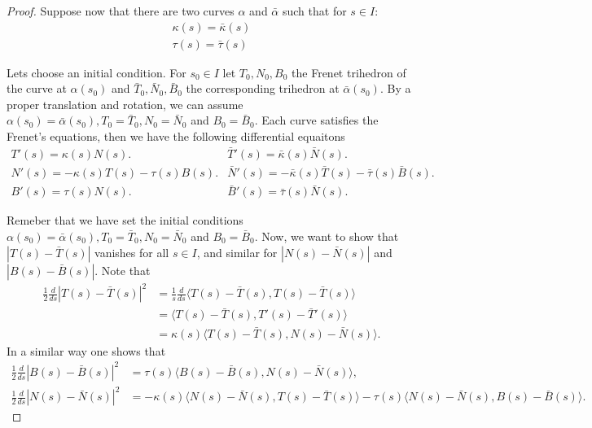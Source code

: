 \documentclass{amsart}
\begin{document}
\begin{proof}
Suppose now that there are two curves \(\alpha\) and \(\bar{\alpha}\) such that for \(s\in I\):
\begin{equation*}
\begin{split}
\kappa(s) = \bar{\kappa}(s)\\
\tau(s) = \bar{\tau}(s)
\end{split}
\end{equation*}

Lets choose an initial condition. For \(s_0\in I\) let \(T_0,N_0,B_0\) the Frenet trihedron of the curve at \(\alpha(s_0)\) and \(\bar{T}_0,\bar{N}_0,\bar{B}_0\) the corresponding trihedron at \(\bar{\alpha}(s_0)\). By a proper translation and rotation, we can assume
\(\alpha(s_0) = \bar{\alpha}(s_0), T_0 = \bar{T}_0, N_0 = \bar{N}_0\) and \(B_0 = \bar{B}_0\). Each curve satisfies the Frenet's equations, then we have the following differential equaitons
\begin{equation*}
\begin{array}{ll}
T'(s) = \kappa(s) N(s). & \bar{T}'(s) = \bar{\kappa}(s) \bar{N}(s).\\
N'(s) = -\kappa(s) T(s) - \tau(s) B(s). &  \bar{N}'(s) = -\bar{\kappa}(s) \bar{T}(s) - \bar{\tau}(s) \bar{B}(s).\\
B'(s) = \tau(s) N(s) . & \bar{B}'(s) = \bar{\tau}(s) \bar{N}(s) .
\end{array}
\end{equation*}

Remeber that we have set the initial conditions \(\alpha(s_0) = \bar{\alpha}(s_0), T_0 = \bar{T}_0, N_0 = \bar{N}_0\) and \(B_0 = \bar{B}_0\).
Now, we want to show that \(|T(s) - \bar{T}(s)|\) vanishes for all \(s\in I\), and similar for \(|N(s) - \bar{N}(s)|\) and \(|B(s) - \bar{B}(s)|\). Note that
\begin{align*}
 \frac{1}{2}\frac{d}{ds} |T(s) - \bar{T}(s)|^2 & = \frac{1}{s}\frac{d}{ds} \langle T(s) - \bar{T}(s), T(s) - \bar{T}(s) \rangle \\ 
& = \langle T(s) - \bar{T}(s), T'(s) - \bar{T}'(s) \rangle \\
& = \kappa(s) \langle T(s) - \bar{T}(s), N(s) - \bar{N}(s) \rangle.
\end{align*}
In a similar way one shows that
\begin{align*}
\frac{1}{2}\frac{d}{ds} |B(s) - \bar{B}(s)|^2 &= \tau(s) \langle B(s) - \bar{B}(s), N(s) - \bar{N}(s) \rangle, \\
\frac{1}{2}\frac{d}{ds} |N(s) - \bar{N}(s)|^2 &= -\kappa(s) \langle N(s) - \bar{N}(s), T(s) - \bar{T}(s) \rangle  -\tau(s) \langle N(s) - \bar{N}(s), B(s) - \bar{B}(s) \rangle.
\end{align*}


\end{proof}
\end{document}
